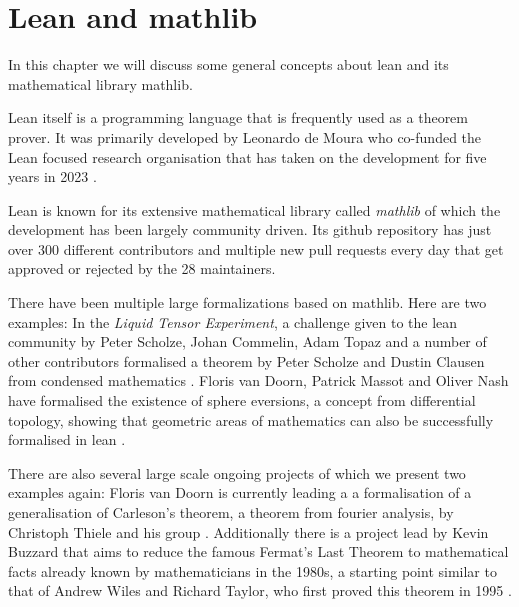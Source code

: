 \chapter{Lean and mathlib}

In this chapter we will discuss some general concepts about lean and its mathematical library mathlib. 

Lean itself is a programming language that is frequently used as a theorem prover. 
It was primarily developed by Leonardo de Moura who co-funded the Lean focused research organisation that has taken on the development for five years in 2023 \cite{LeanFRO2024}. 

Lean is known for its extensive mathematical library called \emph{mathlib} of which the development has been largely community driven. 
Its github repository has just over 300 different contributors and multiple new pull requests every day that get approved or rejected by the 28 maintainers. 

There have been multiple large formalizations based on mathlib. 
Here are two examples: 
In the \emph{Liquid Tensor Experiment}, a challenge given to the lean community by Peter Scholze, Johan Commelin, Adam Topaz and a number of other contributors formalised a theorem by Peter Scholze and Dustin Clausen from condensed mathematics \cite{Commelin2022}.
Floris van Doorn, Patrick Massot and Oliver Nash have formalised the existence of sphere eversions, a concept from differential topology, showing that geometric areas of mathematics can also be successfully formalised in lean \cite{vanDoorn2023}. 

There are also several large scale ongoing projects of which we present two examples again: 
Floris van Doorn is currently leading a a formalisation of a generalisation of Carleson's theorem, a theorem from fourier analysis, by Christoph Thiele and his group \cite{Becker2024}.
Additionally there is a project lead by Kevin Buzzard that aims to reduce the famous Fermat's Last Theorem to mathematical facts already known by mathematicians in the 1980s, a starting point similar to that of Andrew Wiles and Richard Taylor, who first proved this theorem in 1995 \cite{Buzzard2024}. 


